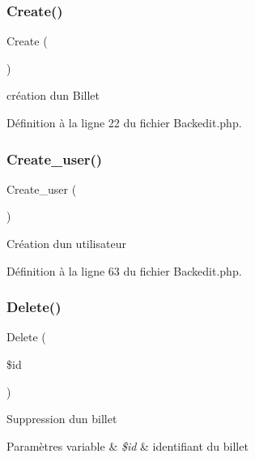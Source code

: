 \subsubsection{\texorpdfstring{Create()}{Create()}}
{\footnotesize\ttfamily Create (\begin{DoxyParamCaption}{ }\end{DoxyParamCaption})}

création d\textquotesingle{}un Billet 

Définition à la ligne 22 du fichier Backedit.\+php.

\mbox{\label{class_src_1_1_controllers_1_1_backedit_af3369c06390987c5f54b6bc444c615ee}} 
\subsubsection{\texorpdfstring{Create\+\_\+user()}{Create\_user()}}
{\footnotesize\ttfamily Create\+\_\+user (\begin{DoxyParamCaption}{ }\end{DoxyParamCaption})}

Création d\textquotesingle{}un utilisateur 

Définition à la ligne 63 du fichier Backedit.\+php.

\mbox{\label{class_src_1_1_controllers_1_1_backedit_a59113b5ecd1d155db6a4f30af34a1e80}} 
\subsubsection{\texorpdfstring{Delete()}{Delete()}}
{\footnotesize\ttfamily Delete (\begin{DoxyParamCaption}\item[{}]{\$id }\end{DoxyParamCaption})}

Suppression d\textquotesingle{}un billet 
\begin{DoxyParams}[1]{Paramètres}
variable & {\em \$id} & identifiant du billet \\
\hline
\end{DoxyParams}


